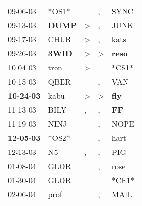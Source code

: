 \begin{supertabular}{p{0.07\textwidth}p{0.06\textwidth}p{0.02\textwidth}p{0.02\textwidth}p{0.06\textwidth}}
          09-06-03\textsuperscript{} &                            *OS1* &                  &                , &           SYNC\textsuperscript{} \\
          09-13-03\textsuperscript{} &  \textbf{DUMP\textsuperscript{}} &     \textgreater &                , &           JUNK\textsuperscript{} \\
          09-17-03\textsuperscript{} &           CHUR\textsuperscript{} &     \textgreater &                , &           kats\textsuperscript{} \\
          09-26-03\textsuperscript{} &  \textbf{3WID\textsuperscript{}} &     \textgreater &     \textgreater &  \textbf{reso\textsuperscript{}} \\
          10-04-03\textsuperscript{} &           tren\textsuperscript{} &     \textgreater &                  &                            *CS1* \\
          10-15-03\textsuperscript{} &           QBER\textsuperscript{} &                  &                , &            VAN\textsuperscript{} \\
 \textbf{10-24-03\textsuperscript{}} &           kabu\textsuperscript{} &     \textgreater &     \textgreater &   \textbf{fly\textsuperscript{}} \\
          11-13-03\textsuperscript{} &           BILY\textsuperscript{} &                , &                , &    \textbf{FF\textsuperscript{}} \\
          11-19-03\textsuperscript{} &           NINJ\textsuperscript{} &                  &                , &           NOPE\textsuperscript{} \\
 \textbf{12-05-03\textsuperscript{}} &                            *OS2* &                  &                , &           hart\textsuperscript{} \\
          12-13-03\textsuperscript{} &             N5\textsuperscript{} &                , &                , &            PIG\textsuperscript{} \\
          01-08-04\textsuperscript{} &           GLOR\textsuperscript{} &                  &                , &           rose\textsuperscript{} \\
          01-30-04\textsuperscript{} &           GLOR\textsuperscript{} &                  &                  &                            *CE1* \\
          02-06-04\textsuperscript{} &           prof\textsuperscript{} &                  &                , &           MAIL\textsuperscript{} \\

\end{supertabular}
